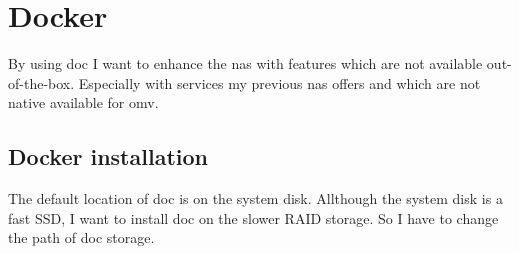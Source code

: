 

\section{Docker}

By using \gls{doc} I want to enhance the \gls{nas} with features which are not
available out-of-the-box. Especially with services my previous \gls{nas} offers
and which are not native available for \gls{omv}.

\subsection{Docker installation}

The default location of \gls{doc} is  on the
system disk. Allthough the system disk is a fast SSD, I want to install
\gls{doc} on the slower RAID storage. So I have to change the path of
\gls{doc} storage.


